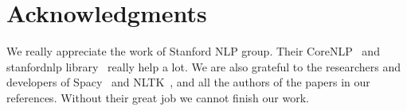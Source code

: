\documentclass[11pt]{article}
\begin{document}
\section*{Acknowledgments} %

We really appreciate the work of Stanford NLP group. Their CoreNLP~\cite{corenlp} and stanfordnlp library~\cite{stanfordnlp} really help a lot. We are also grateful to the researchers and developers of Spacy~\cite{honnibal-johnson:2015:EMNLP} and NLTK~\cite{Loper02nltk:the}, and all the authors of the papers in our references. Without their great job we cannot finish our work.



\end{document}
